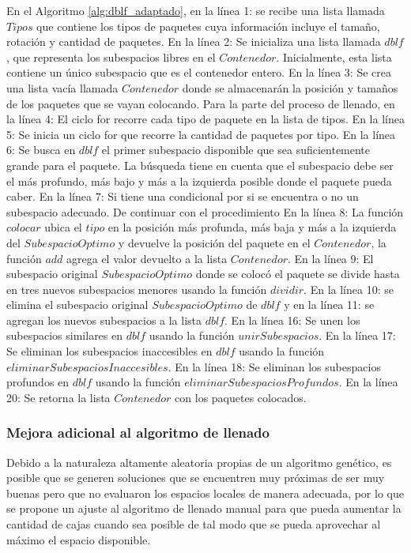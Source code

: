 \documentclass[openany]{article}
\begin{document}
En el Algoritmo \ref{alg:dblf_adaptado}, en la línea 1: se recibe una lista llamada $Tipos$ que contiene los tipos de paquetes cuya información incluye el tamaño, rotación y cantidad de paquetes. En la línea 2: Se inicializa una lista llamada $dblf$, que representa los subespacios libres en el $Contenedor$. Inicialmente, esta lista contiene un único subespacio que es el contenedor entero. En la línea 3: Se crea una lista vacía llamada $Contenedor$ donde se almacenarán la posición y tamaños de los paquetes que se vayan colocando. Para la parte del proceso de llenado, en la línea 4: El ciclo for recorre cada tipo de paquete en la lista de tipos. En la línea 5: Se inicia un ciclo for que recorre la cantidad de paquetes por tipo. En la línea 6: Se busca en $dblf$ el primer subespacio disponible que sea suficientemente grande para el paquete. La búsqueda tiene en cuenta que el subespacio debe ser el más profundo, más bajo y más a la izquierda posible donde el paquete pueda caber. En la línea 7: Si tiene una condicional por si se encuentra o no un subespacio adecuado. De continuar con el procedimiento En la línea 8: La función $colocar$ ubica el $tipo$ en la posición más profunda, más baja y más a la izquierda del $SubespacioOptimo$ y devuelve la posición del paquete en el $Contenedor$, la función $add$ agrega el valor devuelto a la lista $Contenedor$. En la línea 9: El subespacio original $SubespacioOptimo$ donde se colocó el paquete se divide hasta en tres nuevos subespacios menores usando la función $dividir$. En la línea 10: se elimina el subespacio original $SubespacioOptimo$ de $dblf$ y en la línea 11: se agregan los nuevos subespacios a la lista $dblf$. En la línea 16: Se unen los subespacios similares en $dblf$ usando la función $unirSubespacios$. En la línea 17: Se eliminan los subespacios inaccesibles en $dblf$ usando la función $eliminarSubespaciosInaccesibles$. En la línea 18: Se eliminan los subespacios profundos en $dblf$ usando la función $eliminarSubespaciosProfundos$. En la línea 20: Se retorna la lista $Contenedor$ con los paquetes colocados.

\subsubsection{Mejora adicional al algoritmo de llenado}

Debido a la naturaleza altamente aleatoria propias de un algoritmo genético, es posible que se generen soluciones que se encuentren muy próximas de ser muy buenas pero que no evaluaron los espacios locales de manera adecuada, por lo que se propone un ajuste al algoritmo de llenado manual para que pueda aumentar la cantidad de cajas cuando sea posible de tal modo que se pueda aprovechar al máximo el espacio disponible.
\end{document}
